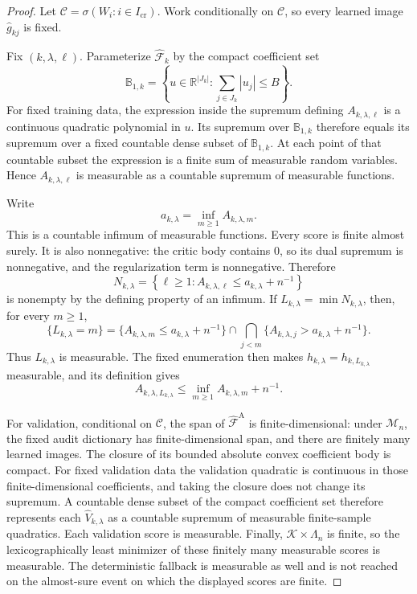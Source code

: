 \begin{proof}
Let \(\mathscr C=\sigma(W_i:i\in I_{\mathrm{cr}})\). Work conditionally on \(\mathscr C\), so every learned image \(\widehat g_{kj}\) is fixed.

Fix \((k,\lambda,\ell)\). Parameterize \(\widehat{\mathcal F}_k\) by the compact coefficient set
\[
 \mathbb B_{1,k}=\left\{u\in\mathbb R^{|J_k|}:\sum_{j\in J_k}|u_j|\le B\right\}.
\]
For fixed training data, the expression inside the supremum defining \(A_{k,\lambda,\ell}\) is a continuous quadratic polynomial in \(u\). Its supremum over \(\mathbb B_{1,k}\) therefore equals its supremum over a fixed countable dense subset of \(\mathbb B_{1,k}\). At each point of that countable subset the expression is a finite sum of measurable random variables. Hence \(A_{k,\lambda,\ell}\) is measurable as a countable supremum of measurable functions.

Write
\[
 a_{k,\lambda}=\inf_{m\ge1}A_{k,\lambda,m}.
\]
This is a countable infimum of measurable functions. Every score is finite almost surely. It is also nonnegative: the critic body contains \(0\), so its dual supremum is nonnegative, and the regularization term is nonnegative. Therefore
\[
 N_{k,\lambda}=\left\{\ell\ge1:A_{k,\lambda,\ell}\le a_{k,\lambda}+n^{-1}\right\}
\]
is nonempty by the defining property of an infimum. If \(L_{k,\lambda}=\min N_{k,\lambda}\), then, for every \(m\ge1\),
\[
 \{L_{k,\lambda}=m\}
 =\{A_{k,\lambda,m}\le a_{k,\lambda}+n^{-1}\}
 \cap\bigcap_{j<m}\{A_{k,\lambda,j}>a_{k,\lambda}+n^{-1}\}.
\]
Thus \(L_{k,\lambda}\) is measurable. The fixed enumeration then makes \(\widehat h_{k,\lambda}=h_{k,L_{k,\lambda}}\) measurable, and its definition gives
\[
 A_{k,\lambda,L_{k,\lambda}}
 \le \inf_{m\ge1}A_{k,\lambda,m}+n^{-1}.
\]

For validation, conditional on \(\mathscr C\), the span of \(\widehat{\mathcal F}^{\mathrm A}\) is finite-dimensional: under \(\mathcal M_n\), the fixed audit dictionary has finite-dimensional span, and there are finitely many learned images. The closure of its bounded absolute convex coefficient body is compact. For fixed validation data the validation quadratic is continuous in those finite-dimensional coefficients, and taking the closure does not change its supremum. A countable dense subset of the compact coefficient set therefore represents each \(\widehat V_{k,\lambda}\) as a countable supremum of measurable finite-sample quadratics. Each validation score is measurable. Finally, \(\mathcal K\times\Lambda_n\) is finite, so the lexicographically least minimizer of these finitely many measurable scores is measurable. The deterministic fallback is measurable as well and is not reached on the almost-sure event on which the displayed scores are finite.
\end{proof}